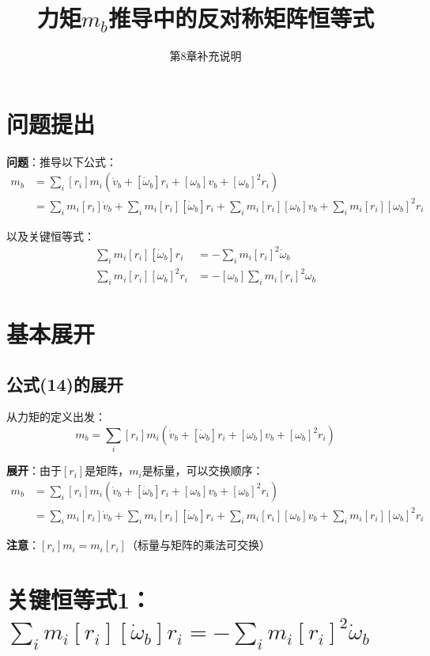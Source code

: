 \documentclass[12pt,a4paper]{article}
\title{力矩$m_b$推导中的反对称矩阵恒等式}
\author{第8章补充说明}
\date{}
\begin{document}
\maketitle

\section{问题提出}

\textbf{问题}：推导以下公式：
\begin{align}
m_b &= \sum_i [r_i] m_i (\dot{v}_b + [\dot{\omega}_b] r_i + [\omega_b] v_b + [\omega_b]^2 r_i) \tag{14} \\
&= \sum_i m_i [r_i] \dot{v}_b + \sum_i m_i [r_i][\dot{\omega}_b] r_i + \sum_i m_i [r_i][\omega_b] v_b + \sum_i m_i [r_i][\omega_b]^2 r_i
\end{align}

以及关键恒等式：
\begin{align}
\sum_i m_i [r_i][\dot{\omega}_b] r_i &= -\sum_i m_i [r_i]^2 \dot{\omega}_b \tag{1} \\
\sum_i m_i [r_i][\omega_b]^2 r_i &= -[\omega_b] \sum_i m_i [r_i]^2 \omega_b \tag{2}
\end{align}

\section{基本展开}

\subsection{公式(14)的展开}

从力矩的定义出发：
\begin{equation}
m_b = \sum_i [r_i] m_i (\dot{v}_b + [\dot{\omega}_b] r_i + [\omega_b] v_b + [\omega_b]^2 r_i)
\end{equation}

\textbf{展开}：由于$[r_i]$是矩阵，$m_i$是标量，可以交换顺序：
\begin{align}
m_b &= \sum_i [r_i] m_i (\dot{v}_b + [\dot{\omega}_b] r_i + [\omega_b] v_b + [\omega_b]^2 r_i) \\
&= \sum_i m_i [r_i] \dot{v}_b + \sum_i m_i [r_i][\dot{\omega}_b] r_i + \sum_i m_i [r_i][\omega_b] v_b + \sum_i m_i [r_i][\omega_b]^2 r_i
\end{align}

\textbf{注意}：$[r_i] m_i = m_i [r_i]$（标量与矩阵的乘法可交换）

\section{关键恒等式1：$\sum_i m_i [r_i][\dot{\omega}_b] r_i = -\sum_i m_i [r_i]^2 \dot{\omega}_b$}
\end{document}

